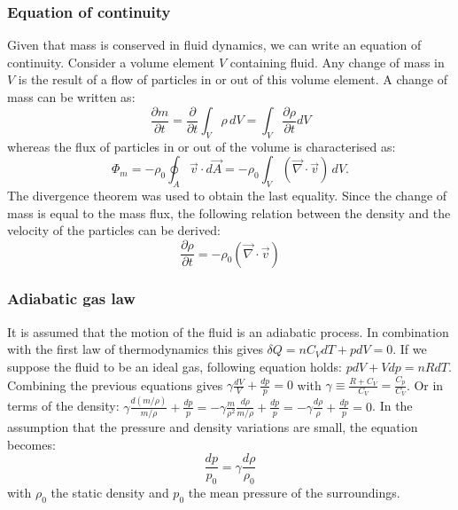 \subsubsection{Equation of continuity}
Given that mass is conserved in fluid dynamics, we can write an equation of continuity. Consider a volume element $V$ containing fluid. Any change of mass in $V$ is the result of a flow of particles in or out of this volume element. A change of mass can be written as:
\[
\frac{\partial m}{\partial t} = \frac{\partial }{\partial t} \int_{V} \rho \,dV =\int_{V} \frac{\partial \rho}{\partial t} dV
\]
whereas the flux of particles in or out of the volume is characterised as:
\[
\Phi_m
= - \rho_0 \oint_A \vec{v} \cdot d\vec{A}
= - \rho_0 \int_{V} (\vec{\nabla} \cdot \vec{v}) \, dV.
\]
The divergence theorem was used to obtain the last equality.
Since the change of mass is equal to the mass flux, the following relation between the density and the velocity of the particles can be derived:
\begin{equation}
\frac{\partial \rho}{\partial t}  = - \rho_0 (\vec{\nabla} \cdot \vec{v})
\label{cont}
\end{equation}


\subsubsection{Adiabatic gas law}
It is assumed that the motion of the fluid is an adiabatic process. In combination with the first law of thermodynamics this gives $\delta Q = n C_V dT + p dV = 0$.
If we suppose the fluid to be an ideal gas, following equation holds: $p dV + V dp = n R dT$.
Combining the previous equations gives $\gamma \frac{dV}{V} + \frac{dp}{p} = 0$ with $\gamma \equiv \frac{R+C_V}{C_V} = \frac{C_p}{C_V}$.
Or in terms of the density: $\gamma \frac{d(m/\rho)}{m/ \rho} + \frac{dp}{p} = -\gamma \frac{m}{\rho^2} \frac{d\rho}{m/ \rho} + \frac{dp}{p} =- \gamma \frac{d\rho}{\rho} + \frac{dp}{p} =0$.
In the assumption that the pressure and density variations are small, the equation becomes:
\begin{equation}
\frac{dp}{p_0} =\gamma \frac{d\rho}{\rho_0}
\label{adia}
\end{equation}
with $\rho_0$ the static density and $p_0$ the mean pressure of the surroundings.





